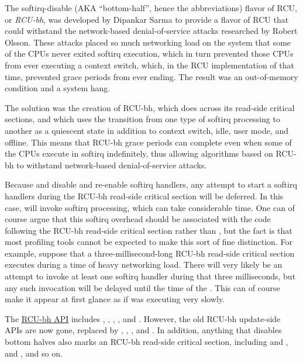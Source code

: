 The softirq-disable (AKA ``bottom-half'', hence the  abbreviations)
flavor of RCU, or \emph{RCU-bh}, was developed by Dipankar Sarma to provide a
flavor of RCU that could withstand the network-based denial-of-service
attacks researched by Robert Olsson.
These attacks placed so much
networking load on the system that some of the CPUs never exited softirq
execution, which in turn prevented those CPUs from ever executing a
context switch, which, in the RCU implementation of that time, prevented
grace periods from ever ending.
The result was an out-of-memory
condition and a system hang.

The solution was the creation of RCU-bh, which does
 across its read-side critical sections, and which
uses the transition from one type of softirq processing to another as a
quiescent state in addition to context switch, idle, user mode, and
offline.
This means that RCU-bh grace periods can complete even when
some of the CPUs execute in softirq indefinitely, thus allowing
algorithms based on RCU-bh to withstand network-based denial-of-service
attacks.

Because  and  disable and
re-enable softirq handlers, any attempt to start a softirq handlers
during the RCU-bh read-side critical section will be deferred.
In this
case,  will invoke softirq processing, which can
take considerable time.
One can of course argue that this softirq
overhead should be associated with the code following the RCU-bh
read-side critical section rather than , but the
fact is that most profiling tools cannot be expected to make this sort
of fine distinction.
For example, suppose that a three-millisecond-long
RCU-bh read-side critical section executes during a time of heavy
networking load.
There will very likely be an attempt to invoke at least
one softirq handler during that three milliseconds, but any such
invocation will be delayed until the time of the
.
This can of course make it appear at first
glance as if  was executing very slowly.

The \href{https://lwn.net/Articles/609973/#RCU%20Per-Flavor%20API%20Table}{RCU-bh API}
includes , , ,
, and .
However, the
old RCU-bh update-side APIs are now gone, replaced by ,
, , and .
In addition,
anything that disables bottom halves also marks an RCU-bh read-side
critical section, including  and ,
 and , and so on.


